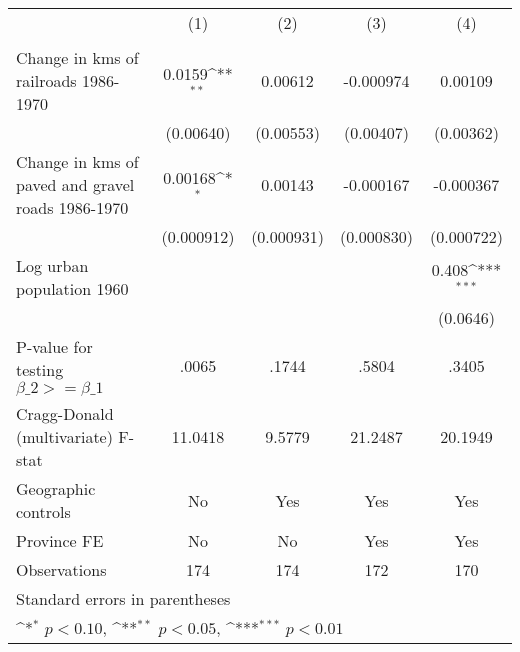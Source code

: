 {
\def\sym#1{\ifmmode^{#1}\else\(^{#1}\)\fi}
\begin{tabular}{l*{4}{c}}
\hline\hline
                &\multicolumn{1}{c}{(1)}&\multicolumn{1}{c}{(2)}&\multicolumn{1}{c}{(3)}&\multicolumn{1}{c}{(4)}\\
                &\multicolumn{1}{c}{}&\multicolumn{1}{c}{}&\multicolumn{1}{c}{}&\multicolumn{1}{c}{}\\
\hline
Change in kms of railroads 1986-1970&   0.0159\sym{**} &  0.00612         &-0.000974         &  0.00109         \\
                &(0.00640)         &(0.00553)         &(0.00407)         &(0.00362)         \\
[1em]
Change in kms of paved and gravel roads 1986-1970&  0.00168\sym{*}  &  0.00143         &-0.000167         &-0.000367         \\
                &(0.000912)         &(0.000931)         &(0.000830)         &(0.000722)         \\
[1em]
Log urban population 1960&                  &                  &                  &    0.408\sym{***}\\
                &                  &                  &                  & (0.0646)         \\
\hline
P-value for testing $\beta\_{2} >= \beta\_{1}$&    .0065         &    .1744         &    .5804         &    .3405         \\
Cragg-Donald (multivariate) F-stat&  11.0418         &   9.5779         &  21.2487         &  20.1949         \\
Geographic controls&       No         &      Yes         &      Yes         &      Yes         \\
Province FE     &       No         &       No         &      Yes         &      Yes         \\
Observations    &      174         &      174         &      172         &      170         \\
\hline\hline
\multicolumn{5}{l}{\footnotesize Standard errors in parentheses}\\
\multicolumn{5}{l}{\footnotesize \sym{*} \(p<0.10\), \sym{**} \(p<0.05\), \sym{***} \(p<0.01\)}\\
\end{tabular}
}
